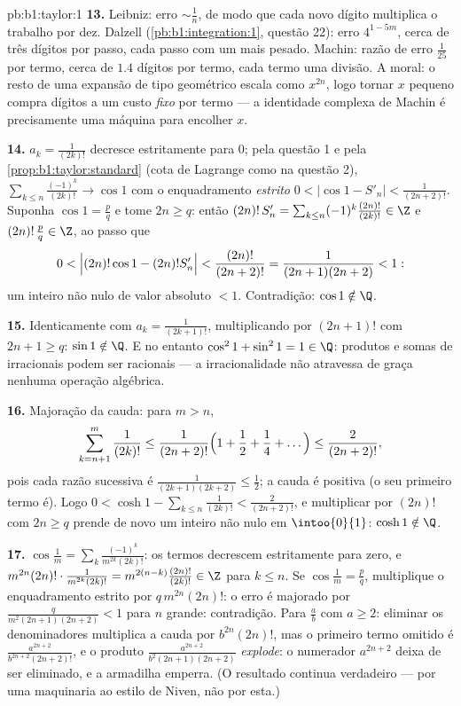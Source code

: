 \begin{solution}{pb:b1:taylor:1}
\textbf{13.} Leibniz: erro $\sim \frac1n$, de modo que cada novo dígito
multiplica o trabalho por dez. Dalzell
(\cref{pb:b1:integration:1}, questão 22): erro $4^{1-5m}$,
cerca de três dígitos por passo, cada passo com um  mais
pesado. Machin: razão de erro $\frac{1}{25}$ por termo, cerca de $1.4$ dígitos
por termo, cada termo uma divisão. A moral: o resto de uma
expansão de tipo geométrico escala como $x^{2n}$, logo tornar $x$
pequeno compra dígitos a um custo \emph{fixo} por termo --- a
identidade complexa de Machin é precisamente uma máquina para
encolher $x$.

\textbf{14.} $a_k = \frac{1}{(2k)!}$ decresce estritamente para $0$;
pela questão 1 e pela \cref{prop:b1:taylor:standard} (cota de Lagrange
como na questão 2), $\sum_{k \leq n}\frac{(-1)^k}{(2k)!}
\to \cos 1$ com o enquadramento \emph{estrito} $0 < \bigl|\cos 1 -
S'_n\bigr| < \frac{1}{(2n+2)!}$.
Suponha $\cos 1 = \frac pq$ e tome $2n \geq q$: então $(2n)!\,S'_n = \sum_{k\leq n} (-1)^k
\frac{(2n)!}{(2k)!} \in \Z$ e $(2n)!\,\frac pq \in \Z$, ao passo que
\[
0 < \Bigl|(2n)!\cos 1 - (2n)!S'_n\Bigr| <
\frac{(2n)!}{(2n+2)!} = \frac{1}{(2n+1)(2n+2)} < 1 :
\]
um inteiro não nulo de valor absoluto $< 1$. Contradição: $\cos
1 \notin \Q$.

\textbf{15.} Identicamente com $a_k = \frac{1}{(2k+1)!}$,
multiplicando por $(2n+1)!$ com $2n + 1 \geq q$: $\sin 1 \notin
\Q$. E no entanto $\cos^2 1 + \sin^2 1 = 1 \in \Q$:
produtos e somas de irracionais podem ser racionais --- a
irracionalidade não atravessa de graça nenhuma operação algébrica.

\textbf{16.} Majoração da cauda: para $m > n$,
\[
\sum_{k=n+1}^{m} \frac{1}{(2k)!}
\leq \frac{1}{(2n+2)!}\Bigl(1 + \frac12 + \frac14 +
\dots\Bigr) \leq \frac{2}{(2n+2)!} ,
\]
pois cada razão sucessiva é $\frac{1}{(2k+1)(2k+2)} \leq
\frac12$; a cauda é positiva (o seu primeiro
termo é). Logo $0 <
\cosh 1 - \sum_{k\leq n}\frac{1}{(2k)!} < \frac{2}{(2n+2)!}$, e multiplicar por $(2n)!$ com $2n \geq q$ prende de
novo um inteiro não nulo em $\intoo{0}{1}$: $\cosh 1 \notin \Q$.

\textbf{17.} $\cos\frac1m = \sum_k
\frac{(-1)^k}{m^{2k}(2k)!}$: os termos decrescem estritamente para
zero, e $m^{2n}(2n)!\cdot\frac{1}{m^{2k}(2k)!} =
m^{2(n-k)}\frac{(2n)!}{(2k)!} \in \Z$ para $k \leq n$. Se
$\cos\frac1m = \frac pq$, multiplique o enquadramento estrito por
$q\,m^{2n}(2n)!$: o erro é majorado por
$\frac{q}{m^2(2n+1)(2n+2)} < 1$ para $n$ grande: contradição.
Para $\frac ab$ com $a \geq 2$: eliminar os denominadores multiplica
a cauda por $b^{2n}(2n)!$, mas o primeiro termo omitido é
$\frac{a^{2n+2}}{b^{2n+2}(2n+2)!}$, e o produto
$\frac{a^{2n+2}}{b^2(2n+1)(2n+2)}$ \emph{explode}: o
numerador $a^{2n+2}$ deixa de ser eliminado, e a armadilha emperra.
(O resultado continua verdadeiro --- por uma maquinaria ao estilo de
Niven, não por esta.)


\end{solution}
